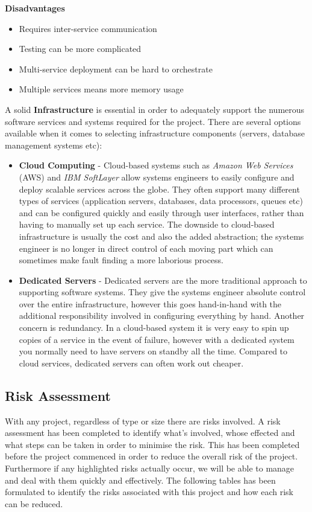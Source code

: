     \textbf{Disadvantages}
    \begin{itemize}
      \item Requires inter-service communication
      \item Testing can be more complicated
      \item Multi-service deployment can be hard to orchestrate
      \item Multiple services means more memory usage
    \end{itemize}
A solid \textbf{Infrastructure} is essential in order to adequately support the numerous software services and systems required for the project. There are several options available when it comes to selecting infrastructure components (servers, database management systems etc):
    \begin{itemize}
      \item \textbf{Cloud Computing} - 
        Cloud-based systems such as \emph{Amazon Web Services} (AWS) and \emph{IBM SoftLayer} allow systems engineers to easily configure and deploy scalable services across the globe. They often support many different types of services (application servers, databases, data processors, queues etc) and can be configured quickly and easily through user interfaces, rather than having to manually set up each service. The downside to cloud-based infrastructure is usually the cost and also the added abstraction; the systems engineer is no longer in direct control of each moving part which can sometimes make fault finding a more laborious process.
      \item \textbf{Dedicated Servers} - 
        Dedicated servers are the more traditional approach to supporting software systems. They give the systems engineer absolute control over the entire infrastructure, however this goes hand-in-hand with the additional responsibility involved in configuring everything by hand. Another concern is redundancy. In a cloud-based system it is very easy to spin up copies of a service in the event of failure, however with a dedicated system you normally need to have servers on standby all the time. Compared to cloud services, dedicated servers can often work out cheaper.
    \end{itemize}

\subsection{Risk Assessment}
With any project, regardless of type or size there are risks involved. A risk assessment has been completed to identify what's involved, whose effected and what steps can be taken in order to minimise the risk.  This has been completed before the project commenced in order to reduce the overall risk of the project.  Furthermore if any highlighted risks actually occur, we will be able to manage and deal with them quickly and effectively.  The following tables has been formulated to identify the risks associated with this project and how each risk can be reduced.\\

